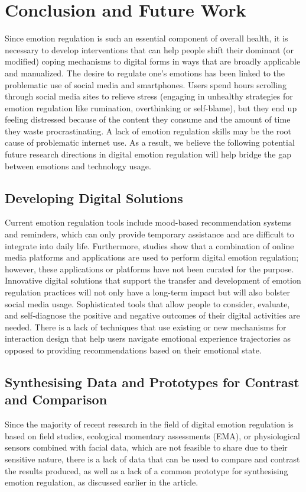 \documentclass[lettersize,journal]{IEEEtran}
\begin{document}
 




\section{Conclusion and Future Work}
Since emotion regulation is such an essential component of overall health, it is necessary to develop interventions that can help people shift their dominant (or modified) coping mechanisms to digital forms in ways that are broadly applicable and manualized. The desire to regulate one's emotions has been linked to the problematic use of social media and smartphones. Users spend hours scrolling through social media sites to relieve stress (engaging in unhealthy strategies for emotion regulation like rumination, overthinking or self-blame), but they end up feeling distressed because of the content they consume and the amount of time they waste procrastinating. A lack of emotion regulation skills may be the root cause of problematic internet use. As a result, we believe the following potential future research directions in digital emotion regulation will help bridge the gap between emotions and technology usage.
\subsection{Developing Digital Solutions} Current emotion regulation tools include mood-based recommendation systems and reminders, which can only provide temporary assistance and are difficult to integrate into daily life. Furthermore, studies show that a combination of online media platforms and applications are used to perform digital emotion regulation; however, these applications or platforms have not been curated for the purpose. Innovative digital solutions that support the transfer and development of emotion regulation practices will not only have a long-term impact but will also bolster social media usage. Sophisticated tools that allow people to consider, evaluate, and self-diagnose the positive and negative outcomes of their digital activities are needed. There is a lack of techniques that use existing or new mechanisms for interaction design that help users navigate emotional experience trajectories as opposed to providing recommendations based on their emotional state.

\subsection{Synthesising Data and Prototypes for Contrast and Comparison} Since the majority of recent research in the field of digital emotion regulation is based on field studies, ecological momentary assessments (EMA), or physiological sensors combined with facial data, which are not feasible to share due to their sensitive nature, there is a lack of data that can be used to compare and contrast the results produced, as well as a lack of a common prototype for synthesising emotion regulation, as discussed earlier in the article.
\end{document}

